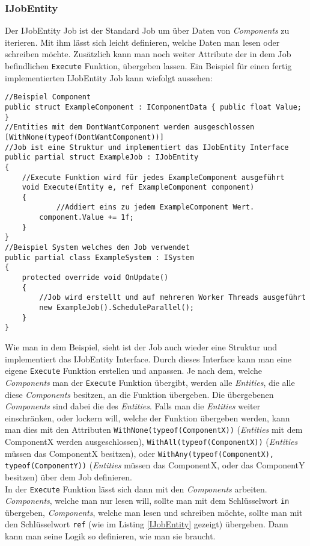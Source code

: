 \subsubsection{IJobEntity}
Der IJobEntity Job ist der Standard Job um über Daten von \textit{Components} zu iterieren. Mit ihm lässt sich leicht definieren, welche Daten man lesen oder schreiben möchte. Zusätzlich kann man noch weiter Attribute der in dem Job befindlichen \texttt{Execute} Funktion, übergeben lassen. Ein Beispiel für einen fertig implementierten IJobEntity Job kann wiefolgt aussehen:
\begin{lstlisting}[style=code, caption={Ein IJobEntity Beispiel für eine einfache Addition.}, label=IJobEntity]
//Beispiel Component
public struct ExampleComponent : IComponentData { public float Value; }
//Entities mit dem DontWantComponent werden ausgeschlossen
[WithNone(typeof(DontWantComponent))]
//Job ist eine Struktur und implementiert das IJobEntity Interface
public partial struct ExampleJob : IJobEntity
{
	//Execute Funktion wird für jedes ExampleComponent ausgeführt
    void Execute(Entity e, ref ExampleComponent component)
    {
    		//Addiert eins zu jedem ExampleComponent Wert.
        component.Value += 1f;
    }
}
//Beispiel System welches den Job verwendet
public partial class ExampleSystem : ISystem
{
    protected override void OnUpdate()
    {
        //Job wird erstellt und auf mehreren Worker Threads ausgeführt
        new ExampleJob().ScheduleParallel();
    }
}
\end{lstlisting}
Wie man in dem Beispiel, sieht ist der Job auch wieder eine Struktur und implementiert das IJobEntity Interface. Durch dieses Interface kann man eine eigene \texttt{Execute} Funktion erstellen und anpassen. Je nach dem, welche \textit{Components} man der \texttt{Execute} Funktion übergibt, werden alle \textit{Entities}, die alle diese \textit{Components} besitzen, an die Funktion übergeben. Die übergebenen \textit{Components} sind dabei die des \textit{Entities}. Falls man die \textit{Entities} weiter einschränken, oder lockern will, welche der Funktion übergeben werden, kann man dies mit den Attributen \texttt{WithNone(typeof(ComponentX))} (\textit{Entities} mit dem ComponentX werden ausgeschlossen), \texttt{WithAll(typeof(ComponentX))} (\textit{Entities} müssen das ComponentX besitzen), oder \texttt{WithAny(typeof(ComponentX), typeof(ComponentY))} (\textit{Entities} müssen das ComponentX, oder das ComponentY besitzen) über dem Job definieren.\\
In der \texttt{Execute} Funktion lässt sich dann mit den \textit{Components} arbeiten. \textit{Components}, welche man nur lesen will, sollte man mit dem Schlüsselwort \texttt{in} übergeben, \textit{Components}, welche man lesen und schreiben möchte, sollte man mit den Schlüsselwort \texttt{ref} (wie im Listing \ref{IJobEntity} gezeigt) übergeben. Dann kann man seine Logik so definieren, wie man sie braucht.
